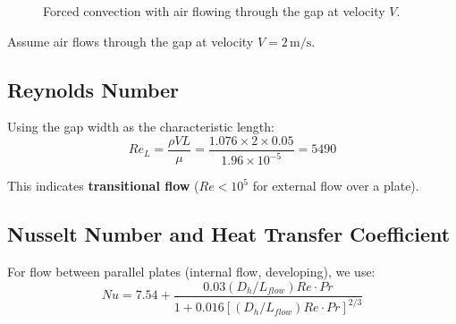 \documentclass[11pt]{article}
\newcommand{\unit}[1]{\,\mathrm{#1}}
\begin{document}
\begin{figure}[h]
\centering
{}
\caption{Forced convection with air flowing through the gap at velocity $V$.}
\label{fig:forced}
\end{figure}

Assume air flows through the gap at velocity $V = 2\unit{m/s}$.

\subsection{Reynolds Number}

Using the gap width as the characteristic length:
\begin{equation}
    Re_L = \frac{\rho V L}{\mu} = \frac{1.076 \times 2 \times 0.05}{1.96 \times 10^{-5}} = \boxed{5490}
\end{equation}

This indicates \textbf{transitional flow} ($Re < 10^5$ for external flow over a plate).

\subsection{Nusselt Number and Heat Transfer Coefficient}

For flow between parallel plates (internal flow, developing), we use:
\begin{equation}
    Nu = 7.54 + \frac{0.03(D_h/L_{flow})Re \cdot Pr}{1 + 0.016[(D_h/L_{flow})Re \cdot Pr]^{2/3}}
\end{equation}
\end{document}
